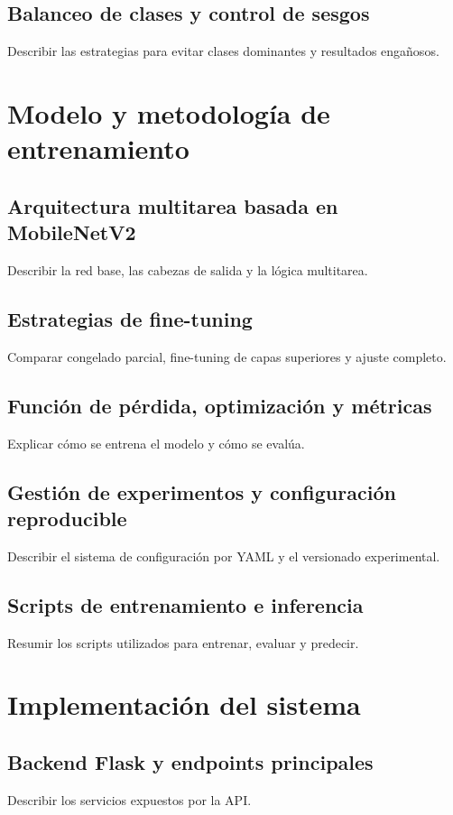 \documentclass[11pt,spanish,listoffigures,listoftables]{tfgetsinf}
\begin{document}
\section{Balanceo de clases y control de sesgos}
Describir las estrategias para evitar clases dominantes y resultados engañosos.

\chapter{Modelo y metodología de entrenamiento}
\section{Arquitectura multitarea basada en MobileNetV2}
Describir la red base, las cabezas de salida y la lógica multitarea.

\section{Estrategias de fine-tuning}
Comparar congelado parcial, fine-tuning de capas superiores y ajuste completo.

\section{Función de pérdida, optimización y métricas}
Explicar cómo se entrena el modelo y cómo se evalúa.

\section{Gestión de experimentos y configuración reproducible}
Describir el sistema de configuración por YAML y el versionado experimental.

\section{Scripts de entrenamiento e inferencia}
Resumir los scripts utilizados para entrenar, evaluar y predecir.

\chapter{Implementación del sistema}
\section{Backend Flask y endpoints principales}
Describir los servicios expuestos por la API.
\end{document}
